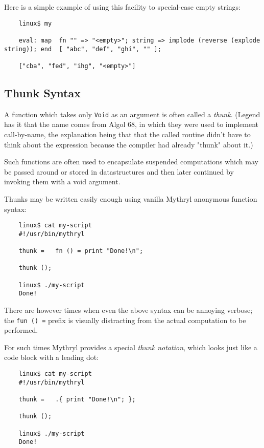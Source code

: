 Here is a simple example of using this facility to special-case empty strings:

\begin{verbatim}
    linux$ my

    eval: map  fn "" => "<empty>"; string => implode (reverse (explode string)); end  [ "abc", "def", "ghi", "" ];

    ["cba", "fed", "ihg", "<empty>"]
\end{verbatim}


\cutend*


\subsection{Thunk Syntax}
\label{section:ref:functions:thunk-syntax}

A function which takes only {\tt Void} as an argument  
is often called a {\it thunk}.  (Legend has it that 
the name comes from Algol 68, in which they were 
used to implement call-by-name, the explanation 
being that that the called routine didn't have to 
think about the expression because the compiler had 
already "thunk" about it.)

Such functions are 
often used to encapsulate suspended computations which 
may be passed around or stored in datastructures and 
then later continued by invoking them with a void 
argument.

Thunks may be written easily enough using vanilla 
Mythryl anonymous function syntax:

\begin{verbatim}
    linux$ cat my-script
    #!/usr/bin/mythryl

    thunk =   fn () = print "Done!\n";

    thunk ();

    linux$ ./my-script
    Done!
\end{verbatim}

There are however times when even the above syntax can be 
annoying verbose;  the {\tt fun () =} prefix is visually 
distracting from the actual computation to be performed.

For such times Mythryl provides a special {\it thunk notation}, 
which looks just like a code block with a leading dot:

\begin{verbatim}
    linux$ cat my-script
    #!/usr/bin/mythryl

    thunk =   .{ print "Done!\n"; };

    thunk ();

    linux$ ./my-script
    Done!
\end{verbatim}

